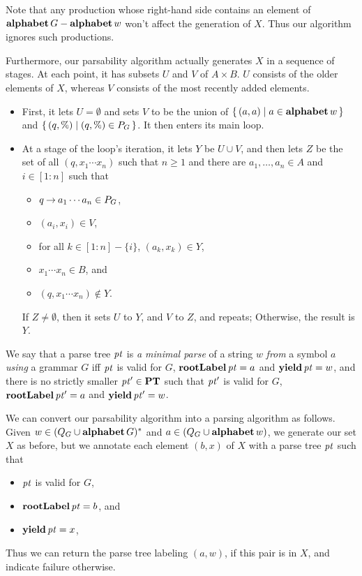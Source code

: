 Note that any production whose right-hand side contains an element of
$\mathbf{alphabet}\,G-\mathbf{alphabet}\,w$ won't affect the generation of $X$.  Thus
our algorithm ignores such productions.

Furthermore, our parsability algorithm actually generates $X$ in a
sequence of stages. At each point, it has subsets $U$ and $V$ of
$A\times B$. $U$ consists of the older elements of $X$, whereas $V$
consists of the most recently added elements.
\begin{itemize}
\item First, it lets $U=\emptyset$ and sets $V$ to be the union of
  $\{ \, (a,a) \mid a\in\mathbf{alphabet}\,w \, \}$ and $\{ \, (q,\%) \mid (q,\%)\in
    P_G \, \}$. It then enters its main loop.

\item At a stage of the loop's iteration, it lets $Y$ be $U\cup V$,
  and then lets $Z$ be the set of all $(q,x_1\cdots x_n)$ such that
  $n\geq 1$ and there are $a_1,\ldots,a_n\in A$ and $i\in[1:n]$ such
  that
  \begin{itemize}
  \item $q\mathbin{\to} a_1\cdots a_n\in P_G$,

  \item $(a_i,x_i)\in V$,

  \item for all $k\in[1:n]-\{i\}$, $(a_k,x_k)\in Y$,

  \item $x_1\cdots x_n\in B$, and

  \item $(q,x_1\cdots x_n)\not\in Y$.
  \end{itemize}
  If $Z\neq\emptyset$, then it sets $U$ to $Y$, and $V$ to $Z$, and
  repeats; Otherwise, the result is $Y$.
\end{itemize}

%
We say that a parse tree ${\it pt}$ is \emph{a minimal parse} of a string
$w$ \emph{from} a symbol $a$ \emph{using} a grammar $G$ iff ${\it pt}$ is
valid for $G$, $\mathbf{rootLabel}\,{\it pt} = a$ and $\mathbf{yield}\,{\it pt} = w$, and there
is no strictly smaller ${\it pt}'\in\mathbf{PT}$ such that ${\it pt}'$ is valid for $G$,
$\mathbf{rootLabel}\,{\it pt}' = a$ and $\mathbf{yield}\,{\it pt}' = w$.

We can convert our parsability algorithm into a parsing algorithm as
follows.  Given $w\in(Q_G\cup\mathbf{alphabet}\,G)^*$ and
$a\in(Q_G\cup\mathbf{alphabet}\,w)$, we generate our set $X$ as before, but we
annotate each element $(b,x)$ of $X$ with a parse tree ${\it pt}$ such that
\begin{itemize}
\item ${\it pt}$ is valid for $G$,

\item $\mathbf{rootLabel}\,{\it pt}=b$, and

\item $\mathbf{yield}\,{\it pt}=x$,
\end{itemize}
Thus we can return the parse tree labeling $(a, w)$, if this pair is
in $X$, and indicate failure otherwise.


